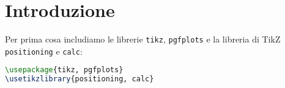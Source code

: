 \section{Introduzione}
Per prima cosa includiamo le librerie \verb|tikz|, \verb|pgfplots| e la libreria di TikZ \verb|positioning| e
\verb|calc|:

\begin{lstlisting}[language=latex]
\usepackage{tikz, pgfplots}
\usetikzlibrary{positioning, calc}
\end{lstlisting}
